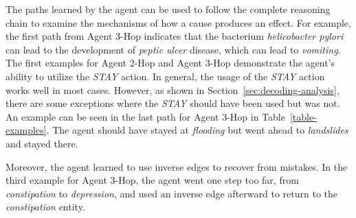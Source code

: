 The paths learned by the agent can be used to follow the complete reasoning chain to examine 
the mechanisms of how a cause produces an effect. For example, the first path from Agent 3-Hop indicates that the 
bacterium \textit{helicobacter pylori} can lead to the development of \textit{peptic ulcer} disease, which can 
lead to \textit{vomiting}. The first examples for Agent 2-Hop and Agent 3-Hop demonstrate the agent's 
ability to utilize the \textit{STAY} action. In general, the usage of the \textit{STAY} action works
well in most cases. However, as shown in Section~\ref{sec:decoding-analysis}, there are some exceptions where the \textit{STAY} should have been used but was not.
An example can be seen in the last path for Agent 3-Hop in Table~\ref{table-examples}.
The agent should have stayed at \textit{flooding} but went ahead to \textit{landslides} and stayed there.

Moreover, the agent learned to use inverse edges to recover from mistakes. In the third example for Agent 3-Hop, the 
agent went one step too far, from \textit{constipation} to \textit{depression}, and used an inverse edge afterward to 
return to the \textit{constipation} entity.


